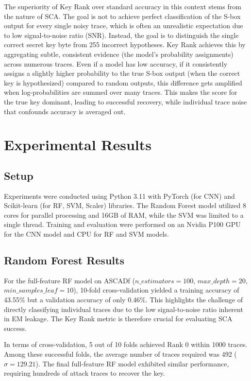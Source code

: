 \documentclass[runningheads]{llncs}
\begin{document}
The superiority of Key Rank over standard accuracy in this context stems from the nature of SCA. The goal is not to achieve perfect classification of the S-box output for every single noisy trace, which is often an unrealistic expectation due to low signal-to-noise ratio (SNR). Instead, the goal is to distinguish the single correct secret key byte from 255 incorrect hypotheses. Key Rank achieves this by aggregating subtle, consistent evidence (the model's probability assignments) across numerous traces. Even if a model has low accuracy, if it consistently assigns a slightly higher probability to the true S-box output (when the correct key is hypothesized) compared to random outputs, this difference gets amplified when log-probabilities are summed over many traces. This makes the score for the true key dominant, leading to successful recovery, while individual trace noise that confounds accuracy is averaged out.
\section{Experimental Results}
\subsection{Setup}
Experiments were conducted using Python 3.11 with PyTorch (for CNN) and Scikit-learn (for RF, SVM, Scaler) libraries. The Random Forest model utilized 8 cores for parallel processing and 16GB of RAM, while the SVM was limited to a single thread. Training and evaluation were performed on an Nvidia P100 GPU for the CNN model and CPU for RF and SVM models.

\subsection{Random Forest Results}
For the full-feature RF model on ASCADf ($n\_estimators=100$, $max\_depth=20$,$min\_samples\_leaf=10$), 10-fold cross-validation yielded a training accuracy of 43.55\% but a validation accuracy of only 0.46\%. This highlights the challenge of directly classifying individual traces due to the low signal-to-noise ratio inherent in EM leakage. The Key Rank metric is therefore crucial for evaluating SCA success.

In terms of cross-validation, 5 out of 10 folds achieved Rank 0 within 1000 traces. Among these successful folds, the average number of traces required was 492 ($\sigma = 129.21$). The final full-feature RF model exhibited similar performance, requiring hundreds of attack traces to recover the key.
\end{document}
